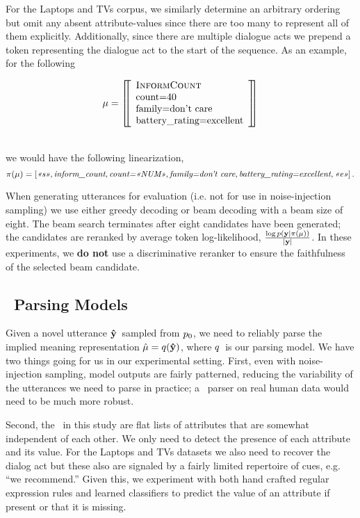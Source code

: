 For the Laptops and TVs corpus, we similarly determine an arbitrary ordering
but omit any absent attribute-values since there are too many to represent all
of them explicitly. Additionally, since there are multiple dialogue acts we
prepend a token representing the dialogue act to the start of the sequence. As
an example, for the following \meaningrepresentation\\[-15pt]
\begin{singlespace}
   \[ \mu =\left[\!\!\left[ \begin{array}{l} 
    \textsc{InformCount} \\
    {\textrm{count=40}}\\
    {\textrm{family=don't care}}\\
    {\textrm{battery\_rating=excellent}}\end{array} \right]\!\!\right] \]
\end{singlespace}~\\
\noindent we would have the following linearization,
\[
    \pi(\mu) = \left[\textit{<<s>>}, \textit{inform\_count}, \textit{count=<<NUM>>}, \textit{family=don't care}, \textit{battery\_rating=excellent}, \textit{<<e>>}\right].  
\]

When generating utterances for evaluation (i.e. not for use in noise-injection
sampling) we use either greedy decoding or beam decoding with a beam size of
eight.  The beam search terminates after eight candidates have been generated;
the candidates are reranked by average token log-likelihood, $\frac{\log
p\left(\mathbf{y}|\pi(\mu)\right)}{{\left\vert \mathbf{y} \right\vert}}$. In these experiments,
we \textbf{do not} use a discriminative reranker to ensure the faithfulness of
the selected beam candidate. 

\subsection{\MeaningRepresentation~Parsing Models}
\label{sec:mrparsermodels}

Given a novel utterance $\boldsymbol{\hat{\mathbf{y}}}$~sampled from $p_0$, we need to
reliably parse the implied meaning representation  $\hat{\mu} =
q(\boldsymbol{\hat{\mathbf{y}}})$, where $q$~is our parsing model. We have two
things going for us in our experimental setting. First, even with
noise-injection sampling, model outputs are fairly patterned, reducing the
variability of the utterances we need to parse in practice; a
\meaningrepresentation~parser on real human data would need to be much more
robust.

Second, the \meaningrepresentation~in this study are flat lists of attributes
that are somewhat independent of each other.  We only need to detect the
presence of each attribute and its value.  For the Laptops and TVs datasets we
also need to recover the dialog act but these also are signaled by a fairly
limited repertoire of cues, e.g. ``we recommend.'' Given this, we experiment
with both hand crafted regular expression rules and learned classifiers to
predict the value of an attribute if present or that it is missing. 

